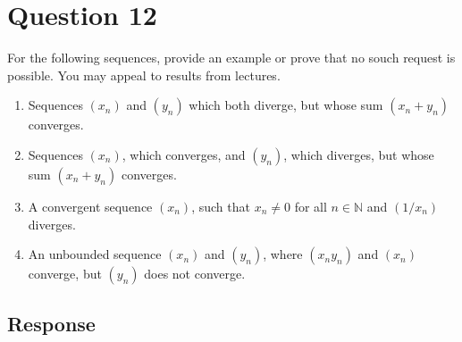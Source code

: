 \documentclass[13pt]{article}
\begin{document}
\section*{Question 12}
For the following sequences, provide an example or prove that no souch
request is possible. You may appeal to results from lectures.
\begin{enumerate}[label=(\alph*)]
\item Sequences $(x_n)$ and $(y_n)$ which both diverge, but whose sum
  $(x_n + y_n)$ converges.
\item Sequences $(x_n)$, which converges, and $(y_n)$, which diverges,
  but whose sum $(x_n + y_n)$ converges.
\item A convergent sequence $(x_n)$, such that $x_n \neq 0$ for all $n
  \in \mathbb{N}$ and $(1/x_n)$ diverges.
\item An unbounded sequence $(x_n)$ and $(y_n)$, where $(x_ny_n)$ and
  $(x_n)$ converge, but $(y_n)$ does not converge.
\end{enumerate}

\subsection*{Response}
\end{document}
